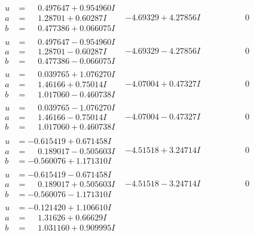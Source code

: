 \documentclass[1p]{elsarticle_modified}
\theoremstyle{definition}
\begin{document}
$$\begin{array}{c|c|c}
\begin{aligned}
u &= \phantom{-}0.497647 + 0.954960 I \\
a &= \phantom{-}1.28701 + 0.60287 I \\
b &= \phantom{-}0.477386 + 0.066075 I\end{aligned}
 & -4.69329 + 4.27856 I & \phantom{-0.000000 } 0 \\ \hline\begin{aligned}
u &= \phantom{-}0.497647 - 0.954960 I \\
a &= \phantom{-}1.28701 - 0.60287 I \\
b &= \phantom{-}0.477386 - 0.066075 I\end{aligned}
 & -4.69329 - 4.27856 I & \phantom{-0.000000 } 0 \\ \hline\begin{aligned}
u &= \phantom{-}0.039765 + 1.076270 I \\
a &= \phantom{-}1.46166 + 0.75014 I \\
b &= \phantom{-}1.017060 - 0.460738 I\end{aligned}
 & -4.07004 + 0.47327 I & \phantom{-0.000000 } 0 \\ \hline\begin{aligned}
u &= \phantom{-}0.039765 - 1.076270 I \\
a &= \phantom{-}1.46166 - 0.75014 I \\
b &= \phantom{-}1.017060 + 0.460738 I\end{aligned}
 & -4.07004 - 0.47327 I & \phantom{-0.000000 } 0 \\ \hline\begin{aligned}
u &= -0.615419 + 0.671458 I \\
a &= \phantom{-}0.189017 - 0.505603 I \\
b &= -0.560076 + 1.171310 I\end{aligned}
 & -4.51518 + 3.24714 I & \phantom{-0.000000 } 0 \\ \hline\begin{aligned}
u &= -0.615419 - 0.671458 I \\
a &= \phantom{-}0.189017 + 0.505603 I \\
b &= -0.560076 - 1.171310 I\end{aligned}
 & -4.51518 - 3.24714 I & \phantom{-0.000000 } 0 \\ \hline\begin{aligned}
u &= -0.121420 + 1.106610 I \\
a &= \phantom{-}1.31626 + 0.66629 I \\
b &= \phantom{-}1.031160 + 0.909995 I\end{aligned}

\end{array}$$
\end{document}
